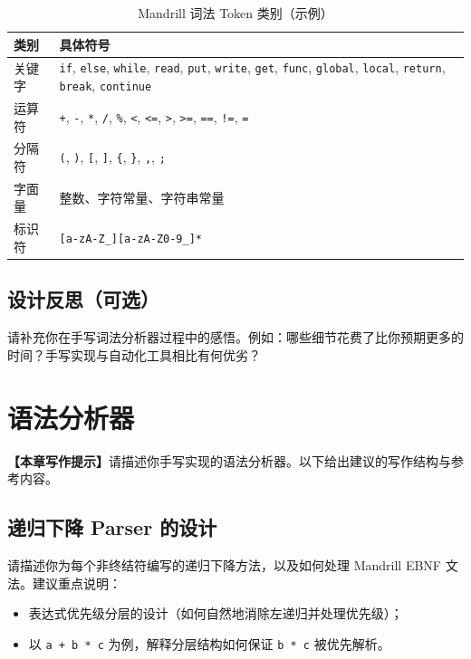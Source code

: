 \documentclass[12pt,hyperref,a4paper,UTF8]{ctexart}
\begin{document}
\begin{table}[!htbp]
    \centering
    \caption{Mandrill 词法 Token 类别（示例）}
    \label{tab:tokens}
    \begin{tabular}{l|l}
    \hline
    类别 & 具体符号 \\ \hline
    关键字 & \texttt{if}, \texttt{else}, \texttt{while}, \texttt{read}, \texttt{put}, \texttt{write}, \texttt{get}, \texttt{func}, \texttt{global}, \texttt{local}, \texttt{return}, \texttt{break}, \texttt{continue} \\
    运算符 & \texttt{+}, \texttt{-}, \texttt{*}, \texttt{/}, \texttt{\%}, \texttt{<}, \texttt{<=}, \texttt{>}, \texttt{>=}, \texttt{==}, \texttt{!=}, \texttt{=} \\
    分隔符 & \texttt{(}, \texttt{)}, \texttt{[}, \texttt{]}, \texttt{\{}, \texttt{\}}, \texttt{,}, \texttt{;} \\
    字面量 & 整数、字符常量、字符串常量 \\
    标识符 & \texttt{[a-zA-Z\_][a-zA-Z0-9\_]*} \\ \hline
    \end{tabular}
\end{table}

\subsection{设计反思（可选）}

请补充你在手写词法分析器过程中的感悟。例如：哪些细节花费了比你预期更多的时间？手写实现与自动化工具相比有何优劣？

\section{语法分析器}

\textbf{【本章写作提示】}请描述你手写实现的语法分析器。以下给出建议的写作结构与参考内容。

\subsection{递归下降 Parser 的设计}

请描述你为每个非终结符编写的递归下降方法，以及如何处理 Mandrill EBNF 文法。建议重点说明：
\begin{itemize}
    \item 表达式优先级分层的设计（如何自然地消除左递归并处理优先级）；
    \item 以 \texttt{a + b * c} 为例，解释分层结构如何保证 \texttt{b * c} 被优先解析。
\end{itemize}
\end{document}
